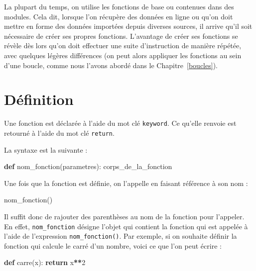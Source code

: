 \documentclass[12pt,]{book}
\newenvironment{Shaded}{\begin{snugshade}}{\end{snugshade}}
\newcommand{\KeywordTok}[1]{\textcolor[rgb]{0.13,0.29,0.53}{\textbf{#1}}}
\newcommand{\DecValTok}[1]{\textcolor[rgb]{0.00,0.00,0.81}{#1}}
\newcommand{\ControlFlowTok}[1]{\textcolor[rgb]{0.13,0.29,0.53}{\textbf{#1}}}
\newcommand{\OperatorTok}[1]{\textcolor[rgb]{0.81,0.36,0.00}{\textbf{#1}}}
\newcommand{\NormalTok}[1]{#1}
\numberwithin{equation}{section}
\numberwithin{countremarque}{section}
\begin{document}
La plupart du temps, on utilise les fonctions de base ou contenues dans
des modules. Cela dit, lorsque l'on récupère des données en ligne ou
qu'on doit mettre en forme des données importées depuis diverses
sources, il arrive qu'il soit nécessaire de créer ses propres fonctions.
L'avantage de créer ses fonctions se révèle dès lors qu'on doit
effectuer une suite d'instruction de manière répétée, avec quelques
légères différences (on peut alors appliquer les fonctions au sein d'une
boucle, comme nous l'avons abordé dans le Chapitre~\ref{boucles}).

\section{Définition}\label{definition}

Une fonction est déclarée à l'aide du mot clé \texttt{keyword}. Ce
qu'elle renvoie est retourné à l'aide du mot clé \texttt{return}.

La syntaxe est la suivante :

\begin{Shaded}
\begin{Highlighting}[]
\KeywordTok{def}\NormalTok{ nom_fonction(parametres):}
\NormalTok{  corps_de_la_fonction}
\end{Highlighting}
\end{Shaded}

Une fois que la fonction est définie, on l'appelle en faisant référence
à son nom :

\begin{Shaded}
\begin{Highlighting}[]
\NormalTok{nom_fonction()}
\end{Highlighting}
\end{Shaded}

Il suffit donc de rajouter des parenthèses au nom de la fonction pour
l'appeler. En effet, \texttt{nom\_fonction} désigne l'objet qui contient
la fonction qui est appelée à l'aide de l'expression
\texttt{nom\_fonction()}. Par exemple, si on souhaite définir la
fonction qui calcule le carré d'un nombre, voici ce que l'on peut écrire
:

\begin{Shaded}
\begin{Highlighting}[]
\KeywordTok{def}\NormalTok{ carre(x):}
  \ControlFlowTok{return}\NormalTok{ x}\OperatorTok{**}\DecValTok{2}
\end{Highlighting}
\end{Shaded}
\end{document}
